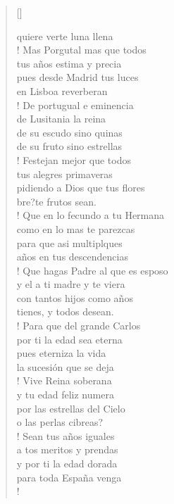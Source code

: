 \begin{multicols}{3}
\begin{verse}[\versewidth]
\begin{altverse}
quiere verte luna llena \\!
Mas Porgutal mas que todos \\
tus años estima y precia \\
pues desde Madrid tus luces \\
en Lisboa reverberan \\!
De portugual e eminencia \\
de Lusitania la reina \\
de su escudo sino quinas \\
de su fruto sino estrellas \\!
Festejan mejor que todos \\
tus alegres primaveras \\
pidiendo a Dios que tus flores \\
bre?te frutos sean. \\!
Que en lo fecundo a tu Hermana \\
como en lo mas te parezcas \\
para que asi multiplques \\
años en tus descendencias \\!
Que hagas Padre al que es esposo \\
y el a ti madre y te viera \\
con tantos hijos como años \\
tienes, y todos desean. \\!
Para que del grande Carlos \\
por ti la edad sea eterna \\
pues eterniza la vida \\
la sucesión que se deja \\!
Vive Reina soberana \\
y tu edad feliz numera \\
por las estrellas del Cielo \\
o las perlas cibreas? \\!
Sean tus años iguales \\
a tos meritos y prendas \\
y por ti la edad dorada \\
para toda España venga \\!
\end{altverse}
\end{verse}

\end{multicols}

\vfill

